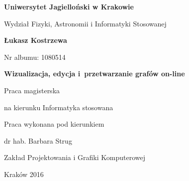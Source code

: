 \begin{titlepage}
\centering
\textbf{\Large Uniwersytet Jagielloński w Krakowie}\par
\vspace{0.2cm}
{\Large Wydział Fizyki, Astronomii i Informatyki Stosowanej}\par
\vfill
\textbf{\Large Łukasz Kostrzewa}\par
\vspace{0.2cm}
{\small Nr albumu: 1080514\par}
\vspace{1.5cm}
\textbf{\huge Wizualizacja, edycja i~przetwarzanie grafów on-line}\par
\vspace{1cm}
Praca magisterska\par
na kierunku Informatyka stosowana\par
\vfill
\begin{flushright}
Praca wykonana pod kierunkiem \par
dr hab. Barbara Strug\par
Zakład Projektowania i Grafiki Komputerowej\par
\end{flushright}
\vspace{1cm}
Kraków 2016\par
\end{titlepage}
